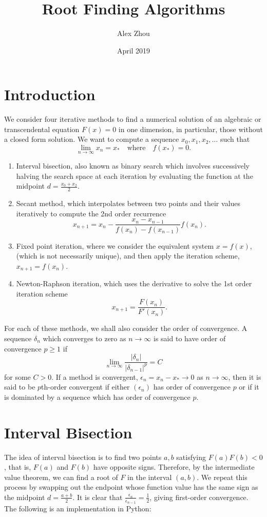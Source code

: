 \documentclass{article}
\title{Root Finding Algorithms}
\author{Alex Zhou}
\date{April 2019}
\begin{document}
\maketitle

\section{Introduction}

We consider four iterative methods to find a numerical solution of an algebraic or transcendental equation \(F(x) = 0\) in one dimension, in particular, those without a closed form solution. We want to compute a sequence \(x_0, x_1, x_2, \dots\) such that
\[ \lim_{n \to \infty} x_n = x_* \quad \mbox{where} \quad f(x_*) = 0. \]

\begin{enumerate}
    \item Interval bisection, also known as binary search which involves successively halving the search space at each iteration by evaluating the function at the midpoint \(d = \frac{x_0 + x_2}{2}\).
    \item Secant method, which interpolates between two points and their values iteratively to compute the 2nd order recurrence
    \[  x_{n+1} = x_n - \frac{x_n - x_{n-1}}{f(x_n) - f(x_{n-1})}f(x_n). \]
    \item Fixed point iteration, where we consider the equivalent system \(x = f(x)\), (which is not necessarily unique), and then apply the iteration scheme, \(x_{n+1} = f(x_{n})\).
    \item Newton-Raphson iteration, which uses the derivative to solve the 1st order iteration scheme
    \[ x_{n+1} = \frac{F(x_{n})}{F'(x_{n})}. \]
\end{enumerate}

For each of these methods, we shall also consider the order of convergence. A sequence \(\delta_n\) which converges to zero as \(n \to \infty\) is said to have order of convergence \(p \geq 1\) if
\[ \lim_{n \to \infty} \frac{|\delta_n|}{|\delta_{n-1}|^p} = C \]
for some \(C > 0\). If a method is convergent, \(\epsilon_n = x_n - x_* \to 0\) as \(n \to \infty\), then it is said to be \(p\)th-order convergent if either \((\epsilon_n)\) has order of convergence \(p\) or if it is dominated by a sequence which has order of convergence \(p\).

\section{Interval Bisection}
The idea of interval bisection is to find two points \(a, b\) satisfying \(F(a)F(b) < 0\), that is, \(F(a)\) and \(F(b)\) have opposite signs. Therefore, by the intermediate value theorem, we can find a root of \(F\) in the interval \((a, b)\). We repeat this process by swapping out the endpoint whose function value has the same sign as the midpoint \(d = \frac{a + b}{2}\). It is clear that \(\frac{\epsilon_n}{\epsilon_{n-1}} = \frac{1}{2}\), giving first-order convergence. The following is an implementation in Python:
\end{document}
